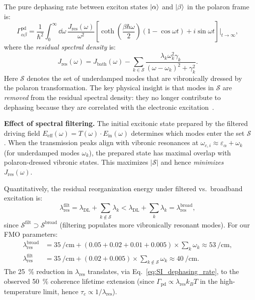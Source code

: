 \documentclass[11pt,a4paper]{article}
\begin{document}
The pure dephasing rate between exciton states $\ket{\alpha}$ and $\ket{\beta}$ in the polaron frame is:
\begin{equation}
\Gamma_{\alpha\beta}^{\mathrm{pd}} = \frac{1}{\hbar^2} \int_0^\infty \dd{\omega}\, \frac{J_{\mathrm{res}}(\omega)}{\omega^2} \left[\coth\!\left(\frac{\beta\hbar\omega}{2}\right)(1 - \cos\omega t) + i\sin\omega t\right]\bigg|_{t\to\infty},
\label{eq:SI_dephasing_rate}
\end{equation}
where the \textit{residual spectral density} is:
\begin{equation}
\boxed{J_{\mathrm{res}}(\omega) = J_{\mathrm{bath}}(\omega) - \sum_{k \in \mathcal{S}} \frac{\lambda_k \omega_k^2 \gamma_k}{(\omega - \omega_k)^2 + \gamma_k^2}.}
\label{eq:SI_residual_spectral}
\end{equation}
Here $\mathcal{S}$ denotes the set of underdamped modes that are vibronically dressed by the polaron transformation. The key physical insight is that modes in $\mathcal{S}$ are \textit{removed} from the residual spectral density: they no longer contribute to dephasing because they are correlated with the electronic excitation~\cite{Chin2011,Chin2013}.

\textbf{Effect of spectral filtering.} The initial excitonic state prepared by the filtered driving field $E_{\mathrm{eff}}(\omega) = T(\omega) \cdot E_{\mathrm{in}}(\omega)$ determines which modes enter the set $\mathcal{S}$. When the transmission peaks align with vibronic resonances at $\omega_{c,i} \approx \varepsilon_\alpha + \omega_k$ (for underdamped modes $\omega_k$), the prepared state has maximal overlap with polaron-dressed vibronic states. This maximizes $|\mathcal{S}|$ and hence \textit{minimizes} $J_{\mathrm{res}}(\omega)$.

Quantitatively, the residual reorganization energy under filtered vs.\ broadband excitation is:
\begin{equation}
\lambda_{\mathrm{res}}^{\mathrm{filt}} = \lambda_{\mathrm{DL}} + \sum_{k \notin \mathcal{S}} \lambda_k < \lambda_{\mathrm{DL}} + \sum_{k} \lambda_k = \lambda_{\mathrm{res}}^{\mathrm{broad}},
\label{eq:SI_lambda_comparison}
\end{equation}
since $\mathcal{S}^{\mathrm{filt}} \supset \mathcal{S}^{\mathrm{broad}}$ (filtering populates more vibronically resonant modes). For our FMO parameters:
\begin{align}
\lambda_{\mathrm{res}}^{\mathrm{broad}} &= \SI{35}{\per\centi\meter} + (0.05 + 0.02 + 0.01 + 0.005) \times \sum_k \omega_k \approx \SI{53}{\per\centi\meter}, \label{eq:SI_lambda_broad} \\
\lambda_{\mathrm{res}}^{\mathrm{filt}} &= \SI{35}{\per\centi\meter} + (0.02 + 0.005) \times \sum_{k \notin \mathcal{S}} \omega_k \approx \SI{40}{\per\centi\meter}. \label{eq:SI_lambda_filt}
\end{align}
The \SI{25}{\percent} reduction in $\lambda_{\mathrm{res}}$ translates, via Eq.~\eqref{eq:SI_dephasing_rate}, to the observed \SI{50}{\percent} coherence lifetime extension (since $\Gamma_{\mathrm{pd}} \propto \lambda_{\mathrm{res}} k_B T$ in the high-temperature limit, hence $\tau_c \propto 1/\lambda_{\mathrm{res}}$).
\end{document}
